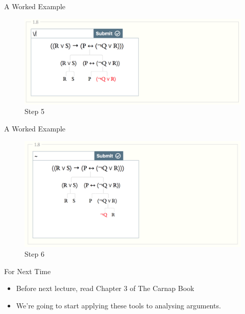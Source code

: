 \documentclass[
  ignorenonframetext,
]{beamer}
\providecommand{\tightlist}{%
  \setlength{\itemsep}{0pt}\setlength{\parskip}{0pt}}
\renewcommand{\,}{\text{, }}
\begin{document}
\begin{frame}{A Worked Example}
\protect\hypertarget{a-worked-example-4}{}

\begin{figure}
\centering
\includegraphics{../images/class02/5.png}
\caption{Step 5}
\end{figure}

\end{frame}

\begin{frame}{A Worked Example}
\protect\hypertarget{a-worked-example-5}{}

\begin{figure}
\centering
\includegraphics{../images/class02/6.png}
\caption{Step 6}
\end{figure}

\end{frame}

\begin{frame}{For Next Time}
\protect\hypertarget{for-next-time}{}

\begin{itemize}
\tightlist
\item
  Before next lecture, read Chapter 3 of The Carnap Book
\item
  We're going to start applying these tools to analysing arguments.
\end{itemize}

\end{frame}
\end{document}
